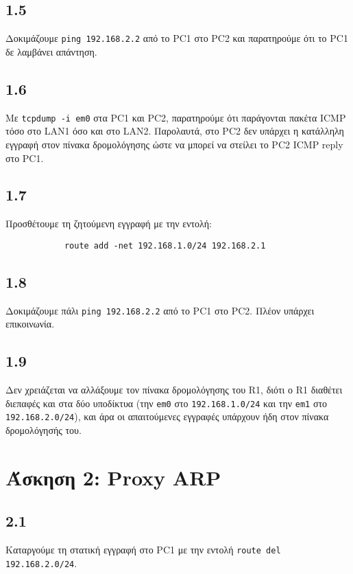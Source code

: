 \documentclass[a4paper, 12pt]{article}
\begin{document}
	\subsection*{1.5}
		Δοκιμάζουμε \verb|ping 192.168.2.2| από το PC1 στο PC2 και παρατηρούμε ότι το PC1 δε λαμβάνει απάντηση.

	\subsection*{1.6}
		Με \verb|tcpdump -i em0| στα PC1 και PC2, παρατηρούμε ότι παράγονται πακέτα ICMP τόσο στο LAN1 όσο και στο LAN2. Παρολαυτά, στο PC2 δεν υπάρχει η κατάλληλη εγγραφή στον πίνακα δρομολόγησης ώστε να μπορεί να στείλει το PC2 ICMP reply στο PC1.

	\subsection*{1.7}
		Προσθέτουμε τη ζητούμενη εγγραφή με την εντολή:
		
		\begin{verbatim}
			route add -net 192.168.1.0/24 192.168.2.1
		\end{verbatim}

	\subsection*{1.8}
		Δοκιμάζουμε πάλι \verb|ping 192.168.2.2| από το PC1 στο PC2. Πλέον υπάρχει επικοινωνία.

	\subsection*{1.9}
		Δεν χρειάζεται να αλλάξουμε τον πίνακα δρομολόγησης του R1, διότι ο R1 διαθέτει διεπαφές και στα δύο υποδίκτυα (την \verb|em0| στο \verb|192.168.1.0/24| και την \verb|em1| στο \verb|192.168.2.0/24|), και άρα οι απαιτούμενες εγγραφές υπάρχουν ήδη στον πίνακα δρομολόγησής του.

\section*{Άσκηση 2: Proxy ARP}

	\subsection*{2.1}
		Καταργούμε τη στατική εγγραφή στο PC1 με την εντολή \verb|route del 192.168.2.0/24|.
\end{document}
